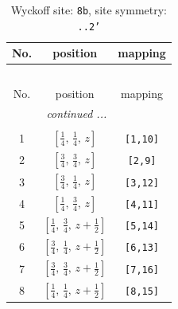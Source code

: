 \documentclass[fleqn,8pt]{jsarticle}
\begin{document}
\begin{longtable}{ccc}
\caption{Wyckoff site: {\tt 8b}, site symmetry: {\tt ..2'}}
 \\
 \hline \hline
No. & position & mapping \\ \hline \endfirsthead

\multicolumn{2}{l}{\tablename\ \thetable{}} \\
 \hline \hline
No. & position & mapping \\ \hline \endhead

 \hline \hline
\multicolumn{2}{r}{\footnotesize\it continued ...} \\ \endfoot

 \hline \hline
\multicolumn{2}{r}{} \\ \endlastfoot

1 & $\left[ \frac{1}{4},\, \frac{1}{4},\, z \right]$ & {\tt [1,10]} \\ \hline
2 & $\left[ \frac{3}{4},\, \frac{3}{4},\, z \right]$ & {\tt [2,9]} \\ \hline
3 & $\left[ \frac{3}{4},\, \frac{1}{4},\, z \right]$ & {\tt [3,12]} \\ \hline
4 & $\left[ \frac{1}{4},\, \frac{3}{4},\, z \right]$ & {\tt [4,11]} \\ \hline
5 & $\left[ \frac{1}{4},\, \frac{3}{4},\, z + \frac{1}{2} \right]$ & {\tt [5,14]} \\ \hline
6 & $\left[ \frac{3}{4},\, \frac{1}{4},\, z + \frac{1}{2} \right]$ & {\tt [6,13]} \\ \hline
7 & $\left[ \frac{3}{4},\, \frac{3}{4},\, z + \frac{1}{2} \right]$ & {\tt [7,16]} \\ \hline
8 & $\left[ \frac{1}{4},\, \frac{1}{4},\, z + \frac{1}{2} \right]$ & {\tt [8,15]} \\
\end{longtable}
\renewcommand{\arraystretch}{1.2}
\end{document}
